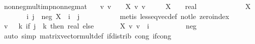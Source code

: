 \begin{isabellebody}
\ nonneg{\isacharunderscore}{\kern0pt}mult{\isacharunderscore}{\kern0pt}imp{\isacharunderscore}{\kern0pt}nonneg{\isacharunderscore}{\kern0pt}mat{\isacharcolon}{\kern0pt}\isanewline
\ \ \ {\isachardoublequoteopen}{\isasymAnd}v{\isachardot}{\kern0pt}\ v\ {\isasymge}\ {}\ {\isasymLongrightarrow}\ X\ {\isacharasterisk}{\kern0pt}v\ v\ {\isasymge}\ {}{\isachardoublequoteclose}\isanewline
\ \ \ {\isachardoublequoteopen}X\ {\isasymge}\ {\isacharparenleft}{\kern0pt}{}\ {\isacharcolon}{\kern0pt}{\isacharcolon}{\kern0pt}\ real\ {\isacharcircum}{\kern0pt}\ {\isacharunderscore}{\kern0pt}\ {\isacharcircum}{\kern0pt}{\isacharunderscore}{\kern0pt}{\isacharparenright}{\kern0pt}{\isachardoublequoteclose}\isanewline
%
\isadelimproof
%
\endisadelimproof
%
\isatagproof
{}\isamarkupfalse%
\ {\isacharminus}{\kern0pt}\isanewline
\ \ \isacommand{{\isacharbraceleft}{\kern0pt}}\isamarkupfalse%
\ \isamarkupfalse%
\ {\isachardoublequoteopen}{\isasymnot}\ {\isacharparenleft}{\kern0pt}{}\ {\isasymle}\ X{\isacharparenright}{\kern0pt}{\isachardoublequoteclose}\isanewline
\ \ \ \ \isamarkupfalse%
\ \isamarkupfalse%
\ i\ j\ \ neg{\isacharcolon}{\kern0pt}\ {\isachardoublequoteopen}X\ {\isachardollar}{\kern0pt}\ i\ {\isachardollar}{\kern0pt}\ j\ {\isacharless}{\kern0pt}\ {}{\isachardoublequoteclose}\ \isanewline
\ \ \ \ \ \ \isamarkupfalse%
\ {\isacharparenleft}{\kern0pt}metis\ less{\isacharunderscore}{\kern0pt}eq{\isacharunderscore}{\kern0pt}vec{\isacharunderscore}{\kern0pt}def\ not{\isacharunderscore}{\kern0pt}le\ zero{\isacharunderscore}{\kern0pt}index{\isacharparenright}{\kern0pt}\isanewline
\ \ \ \ \isamarkupfalse%
\ {\isacharquery}{\kern0pt}v\ {\isacharequal}{\kern0pt}\ {\isachardoublequoteopen}{\isasymchi}\ k{\isachardot}{\kern0pt}\ if\ j\ {\isacharequal}{\kern0pt}\ k\ then\ {}{\isacharcolon}{\kern0pt}{\isacharcolon}{\kern0pt}real\ else\ {}{\isachardoublequoteclose}\isanewline
\ \ \ \ \isamarkupfalse%
\ {\isachardoublequoteopen}{\isacharparenleft}{\kern0pt}X\ {\isacharasterisk}{\kern0pt}v\ {\isacharquery}{\kern0pt}v{\isacharparenright}{\kern0pt}\ {\isachardollar}{\kern0pt}\ i\ {\isacharless}{\kern0pt}\ {}{\isachardoublequoteclose}\isanewline
\ \ \ \ \ \ \isamarkupfalse%
\ neg\isanewline
\ \ \ \ \ \ \isamarkupfalse%
\ {\isacharparenleft}{\kern0pt}auto\ simp{\isacharcolon}{\kern0pt}\ matrix{\isacharunderscore}{\kern0pt}vector{\isacharunderscore}{\kern0pt}mult{\isacharunderscore}{\kern0pt}def\ if{\isacharunderscore}{\kern0pt}distrib\ cong{\isacharcolon}{\kern0pt}\ if{\isacharunderscore}{\kern0pt}cong{\isacharparenright}{\kern0pt}\isanewline

\end{isabellebody}
